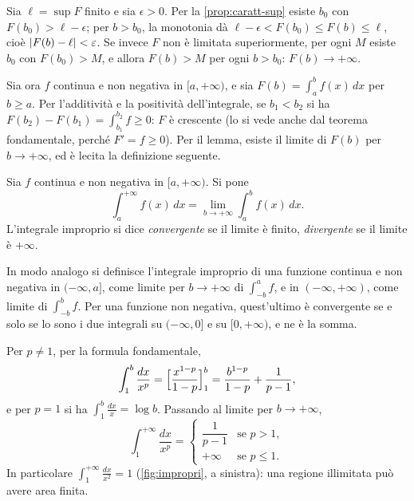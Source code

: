 \begin{dimostrazione}
Sia $\ell=\sup F$ finito e sia $\epsilon>0$. Per la \cref{prop:caratt-sup} esiste $b_{0}$ con
$F(b_{0})>\ell-\epsilon$; per $b>b_{0}$, la monotonia dà $\ell-\epsilon<F(b_{0})\le F(b)\le\ell$, cioè
$\lvert F(b)-\ell\rvert<\varepsilon$. Se invece $F$ non è limitata superiormente, per ogni $M$ esiste $b_{0}$
con $F(b_{0})>M$, e allora $F(b)>M$ per ogni $b>b_{0}$: $F(b)\to+\infty$.
\end{dimostrazione}

Sia ora $f$ continua e non negativa in $[a,+\infty)$, e sia $F(b)=\int_{a}^{b}f(x)\,dx$ per
$b\ge a$. Per l'additività e la positività dell'integrale, se $b_{1}<b_{2}$ si ha
$F(b_{2})-F(b_{1})=\int_{b_{1}}^{b_{2}}f\ge0$: $F$ è crescente (lo si vede anche dal teorema
fondamentale, perché $F'=f\ge0$). Per il lemma, esiste il limite di $F(b)$ per
$b\to+\infty$, ed è lecita la definizione seguente.

\begin{definizione}
\label{def:improprio-illimitato}
Sia $f$ continua e non negativa in $[a,+\infty)$. Si pone
\begin{equation}\label{eq:improprio-illimitato}
  \int_{a}^{+\infty}f(x)\,dx=\lim_{b\to+\infty}\int_{a}^{b}f(x)\,dx .
\end{equation}
L'integrale improprio si dice \emph{convergente} se il limite è finito, \emph{divergente}
se il limite è $+\infty$.
\end{definizione}

In modo analogo si definisce l'integrale improprio di una funzione continua e non
negativa in $(-\infty,a]$, come limite per $b\to+\infty$ di $\int_{-b}^{a}f$, e in $(-\infty,+\infty)$,
come limite di $\int_{-b}^{b}f$. Per una funzione non negativa, quest'ultimo è convergente se e
solo se lo sono i due integrali su $(-\infty,0]$ e su $[0,+\infty)$, e ne è la somma.

\begin{esempio}\label{es:impropri-p-infinito}
Per $p\neq1$, per la formula fondamentale,
\[
  \int_{1}^{b}\frac{dx}{x^{p}}=\Bigl[\frac{x^{1-p}}{1-p}\Bigr]_{1}^{b}=\frac{b^{1-p}}{1-p}+\frac1{p-1} ,
\]
e per $p=1$ si ha $\int_{1}^{b}\frac{dx}x=\log b$. Passando al limite per $b\to+\infty$,
\begin{equation}\label{eq:impropri-p-infinito}
  \int_{1}^{+\infty}\frac{dx}{x^{p}}=
  \begin{cases} \dfrac1{p-1} & \text{se } p>1,\\[4pt] +\infty & \text{se } p\le1 . \end{cases}
\end{equation}
In particolare $\int_{1}^{+\infty}\frac{dx}{x^{2}}=1$ (\cref{fig:impropri}, a sinistra): una regione
illimitata può avere area finita.
\end{esempio}


